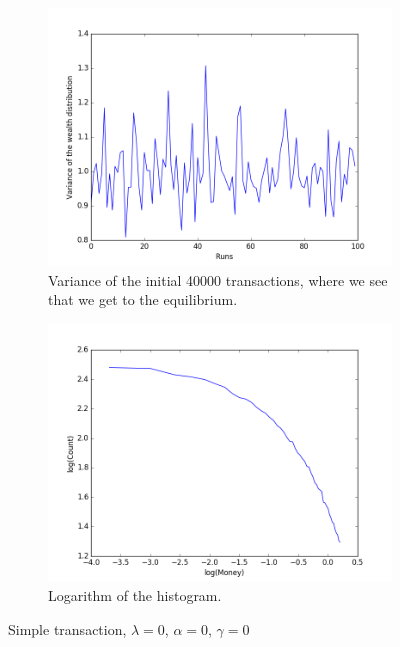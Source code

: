 \documentclass[a4paper,11pt]{article}
\begin{document}
{\begin{figure}[H]
	\centering
	\begin{subfigure}[b]{0.4\textwidth}
		\includegraphics[scale=0.4]{propersimpleinit}
		\caption{Variance of the initial 40000 transactions, where we see that we get to the equilibrium. }
		\label{fig:propersimpleinit}
	\end{subfigure}
	\begin{subfigure}[b]{0.4\textwidth}
		\includegraphics[scale=0.4]{Proper_simple_transaction_log}
		\caption{Logarithm of the histogram. }
		\label{fig:Proper_simple_transaction_log}
	\end{subfigure}
	\caption{Simple transaction, $\lambda=0$, $\alpha=0$, $\gamma=0$}
	\label{fig:simple}
\end{figure}


}
\end{document}
